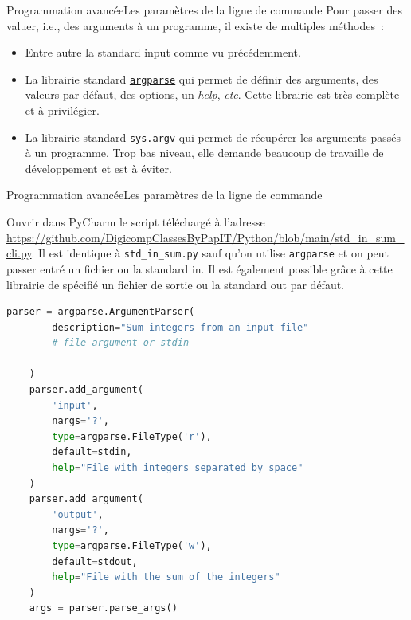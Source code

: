 \documentclass{beamer}
\begin{document}
    \begin{frame}{Programmation avancée}{Les paramètres de la ligne de commande}
        Pour passer des valuer, i.e., des arguments à un programme, il existe de multiples méthodes~:
        \begin{itemize}
            \item Entre autre la standard input comme vu précédemment.
            \item La librairie standard \href{https://docs.python.org/3/library/argparse.html}{\lstinline{argparse}} qui permet de définir des arguments, des valeurs par défaut, des options, un \textit{help}, \textit{etc}.
            Cette librairie est très complète et à privilégier.
            \item La librairie standard \href{https://docs.python.org/3/library/sys.html\#sys.argv}{\lstinline{sys.argv}} qui permet de récupérer les arguments passés à un programme.
            Trop bas niveau, elle demande beaucoup de travaille de développement et est à éviter.
        \end{itemize}
    \end{frame}

    \begin{frame}[fragile]{Programmation avancée}{Les paramètres de la ligne de commande}
        \begin{footnotesize}
            Ouvrir dans PyCharm le script téléchargé à l'adresse \url{https://github.com/DigicompClassesByPapIT/Python/blob/main/std_in_sum_cli.py}.
            Il est identique à \lstinline{std_in_sum.py} sauf qu'on utilise \lstinline{argparse} et on peut passer entré un fichier ou la standard in.
            Il est également possible grâce à cette librairie de spécifié un fichier de sortie ou la standard out par défaut.
        \end{footnotesize}
        \begin{lstlisting}[language=Python,basicstyle=\tiny\ttfamily]
    parser = argparse.ArgumentParser(
        description="Sum integers from an input file"
        # file argument or stdin

    )
    parser.add_argument(
        'input',
        nargs='?',
        type=argparse.FileType('r'),
        default=stdin,
        help="File with integers separated by space"
    )
    parser.add_argument(
        'output',
        nargs='?',
        type=argparse.FileType('w'),
        default=stdout,
        help="File with the sum of the integers"
    )
    args = parser.parse_args()
        \end{lstlisting}
    \end{frame}
\end{document}
